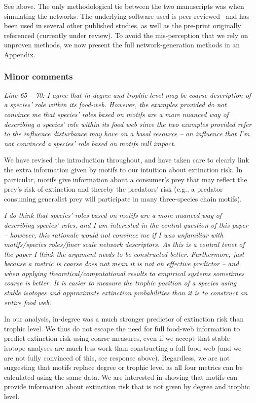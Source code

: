 \documentclass[12pt]{article}
\newcommand{\us}{\rm \setlength{\leftskip}{0.3cm} \setlength{\rightskip}{0.3cm}}
\newcommand{\them}{\it \setlength{\leftskip}{0cm} \setlength{\rightskip}{0cm}}
\begin{document}
        \us See above. The only methodological tie between the two manuscripts was when simulating the networks. The underlying software used is peer-reviewed~\citep{Delmas2017} and has been used in several other published studies, as well as the pre-print originally referenced (currently under review). To avoid the mis-perception that we rely on unproven methods, we now present the full network-generation methods in an Appendix.

    \subsubsection*{Minor comments}
        
        \them
        Line 65 – 70: I agree that in-degree and trophic level may be coarse description of a species’ role within its food-web. However, the examples provided do not convince me that species’ roles based on motifs are a more nuanced way of describing a species’ role within its food web since the two examples provided refer to the influence disturbance may have on a basal resource – an influence that I’m not convinced a species’ role based on motifs will impact.  
        
        
        \us
        We have revised the introduction throughout, and have taken care to clearly link the extra information given by motifs to our intuition about extinction risk. In particular, motifs give information about a consumer's prey that may reflect the prey's risk of extinction and thereby the predators' risk (e.g., a predator consuming generalist prey will participate in many three-species chain motifs).
        
        
        \them
        I do think that species’ roles based on motifs are a more nuanced way of describing species’ roles, and I am interested in the central question of this paper – however, this rationale would not convince me if I was unfamiliar with motifs/species roles/finer scale network descriptors.  As this is a central tenet of the paper I think the argument needs to be constructed better. Furthermore, just because a metric is coarse does not mean it is not an effective predictor – and when applying theoretical/computational results to empirical systems sometimes coarse is better. It is easier to measure the trophic position of a species using stable isotopes and approximate extinction probabilities than it is to construct an entire food web.
        
        \us In our analysis, in-degree was a much stronger predictor of extinction risk than trophic level. We thus do not escape the need for full food-web information to predict extinction risk using coarse measures, even if we accept that stable isotope analyses are much less work than constructing a full food web (and we are not fully convinced of this, see response above). 
        Regardless, we are not suggesting that motifs replace degree or trophic level as all four metrics can be calculated using the same data. We are interested in showing that motifs can provide information about extinction risk that is not given by degree and trophic level.
        
\end{document}
